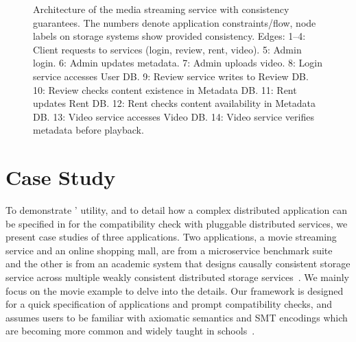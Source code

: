 \begin{figure}
\begin{minipage}[c]{0.5\textwidth}
	\end{minipage}
	\begin{minipage}[c]{0.48\textwidth}
		\centering
  \caption{Architecture of the media streaming service with
    consistency guarantees. The numbers denote application
    constraints/flow, node labels on storage systems show
    provided consistency. Edges:
    1–4: Client requests to services (login, review, rent, video).
    5: Admin login.
    6: Admin updates metadata.
    7: Admin uploads video.
    8: Login service accesses User DB.
    9: Review service writes to Review DB.
    10: Review checks content existence in Metadata DB.
    11: Rent updates Rent DB.
    12: Rent checks content availability in Metadata DB.
    13: Video service accesses Video DB.
    14: Video service verifies metadata before playback.
    \\
}
  \label{fig:case-study-media}
	\end{minipage}
		\vspace{-0.3in}
\end{figure}
\section{Case Study}
\label{sec:cs}

To demonstrate \sysname{}' utility, and to detail how a complex distributed
application can be specified in \sysname{} for the compatibility check with
pluggable distributed services, we present case studies of three applications.
Two applications, a movie streaming service and an online shopping
mall, are from
a microservice benchmark suite~\cite{gan2019an} and the other is from an
academic system that designs causally consistent storage service
across multiple weakly consistent distributed storage services~\cite{boltoncc}.
We mainly focus on the movie example to delve into the details.
Our framework is designed for a quick specification of applications
and prompt compatibility checks, and assumes users to be familiar with
axiomatic semantics and SMT encodings which are becoming more common and 
widely taught in schools~\cite{fmedu1, fmedu2, fmedu3, fmedu4}.

